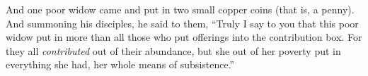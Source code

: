 \begin{biblechapter}
\verse And one poor widow came and put in two small copper coins (that is, a penny).
\verse And summoning his disciples, he said to them, “Truly I say to you that this poor widow put in more than all those who put offerings into the contribution box.
\verse For they all \textit{contributed} out of their abundance, but she out of her poverty put in everything she had, her whole means of subsistence.”
\end{biblechapter}

